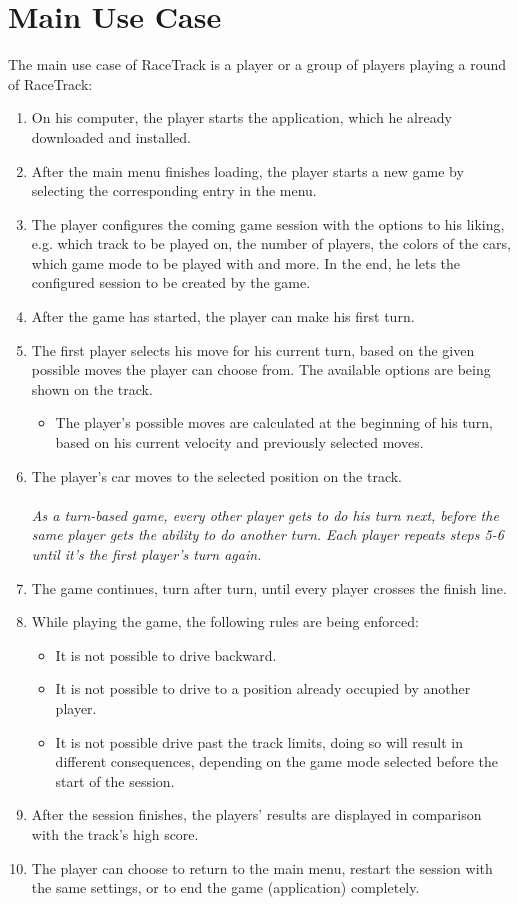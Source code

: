 \section{Main Use Case}
	The main use case of RaceTrack is a player or a group of players playing a round of RaceTrack:
	\begin{enumerate}
		\item On his computer, the player starts the application, which he already downloaded and installed.
		\item After the main menu finishes loading, the player starts a new game by selecting the corresponding entry in the menu.
		\item The player configures the coming game session with the options to his liking, e.g. which track to be played on, the number of players, the colors of the cars, which game mode to be played with and more. In the end, he lets the configured session to be created by the game.
		\item After the game has started, the player can make his first turn.
		\item The first player selects his move for his current turn, based on the given possible moves the player can choose from. The available options are being shown on the track.
		\begin{itemize}
			\item The player's possible moves are calculated at the beginning of his turn, based on his current velocity and previously selected moves.
		\end{itemize}
		\item The player's car moves to the selected position on the track.
		\\~\\ \textit{As a turn-based game, every other player gets to do his turn next, before the same player gets the ability to do another turn. Each player repeats steps 5-6 until it's the first player's turn again.}
		\item The game continues, turn after turn, until every player crosses the finish line.
		\item While playing the game, the following rules are being enforced:
		\begin{itemize}
			\item It is not possible to drive backward.
			\item It is not possible to drive to a position already occupied by another player.
			\item It is not possible drive past the track limits, doing so will result in different consequences, depending on the game mode selected before the start of the session.
		\end{itemize}
		\item After the session finishes, the players' results are displayed in comparison with the track's high score.
		\item The player can choose to return to the main menu, restart the session with the same settings, or to end the game (application) completely.
	\end{enumerate}